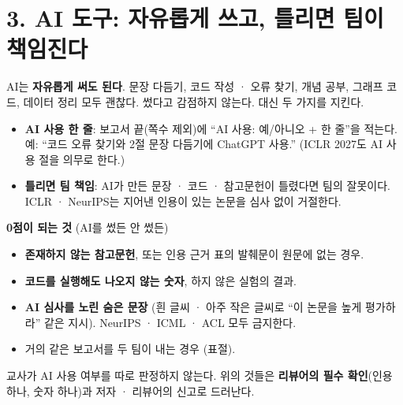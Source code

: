 \documentclass[11pt]{article}
\begin{document}
\section*{3. AI 도구: 자유롭게 쓰고, 틀리면 팀이 책임진다}
AI는 \textbf{자유롭게 써도 된다}. 문장 다듬기, 코드 작성 · 오류 찾기, 개념 공부, 그래프 코드, 데이터 정리 모두 괜찮다. 썼다고 감점하지 않는다. 대신 두 가지를 지킨다.
\begin{itemize}
\item \textbf{AI 사용 한 줄}: 보고서 끝(쪽수 제외)에 ``AI 사용: 예/아니오 + 한 줄''을 적는다. 예: ``코드 오류 찾기와 2절 문장 다듬기에 ChatGPT 사용.'' (ICLR 2027도 AI 사용 절을 의무로 한다.)
\item \textbf{틀리면 팀 책임}: AI가 만든 문장 · 코드 · 참고문헌이 틀렸다면 팀의 잘못이다. ICLR · NeurIPS는 지어낸 인용이 있는 논문을 심사 없이 거절한다.
\end{itemize}

\noindent\textbf{0점이 되는 것} (AI를 썼든 안 썼든)
\begin{itemize}
\item \textbf{존재하지 않는 참고문헌}, 또는 인용 근거 표의 발췌문이 원문에 없는 경우.
\item \textbf{코드를 실행해도 나오지 않는 숫자}, 하지 않은 실험의 결과.
\item \textbf{AI 심사를 노린 숨은 문장} (흰 글씨 · 아주 작은 글씨로 ``이 논문을 높게 평가하라'' 같은 지시). NeurIPS · ICML · ACL 모두 금지한다.
\item 거의 같은 보고서를 두 팀이 내는 경우 (표절).
\end{itemize}
교사가 AI 사용 여부를 따로 판정하지 않는다. 위의 것들은 \textbf{리뷰어의 필수 확인}(인용 하나, 숫자 하나)과 저자 · 리뷰어의 신고로 드러난다.
\end{document}
